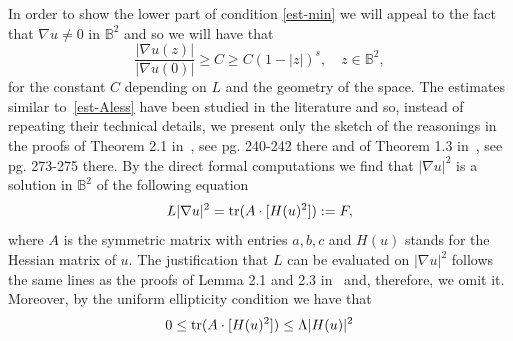 \documentclass[11pt,a4paper,reqno]{amsart}
\theoremstyle{definition}
\def\vint{\mathop{\mathchoice%
          {\setbox0\hbox{$\displaystyle\intop$}\kern 0.22\wd0%
           \vcenter{\hrule width 0.6\wd0}\kern -0.82\wd0}%
          {\setbox0\hbox{$\textstyle\intop$}\kern 0.2\wd0%
           \vcenter{\hrule width 0.6\wd0}\kern -0.8\wd0}%
          {\setbox0\hbox{$\scriptstyle\intop$}\kern 0.2\wd0%
           \vcenter{\hrule width 0.6\wd0}\kern -0.8\wd0}%
          {\setbox0\hbox{$\scriptscriptstyle\intop$}\kern 0.2\wd0%
           \vcenter{\hrule width 0.6\wd0}\kern -0.8\wd0}}%
          \mathopen{}\int}
\newcommand{\BB}{\mathbb{B}^2}
\numberwithin{komcounter}{section}
\begin{document}
In order to show the lower part of condition \eqref{est-min} we will appeal to the fact that $\nabla u\not =0$ in $\BB$ and so we will have that 
\begin{equation}\label{est-Aless}
 \frac{|\nabla u(z)|}{|\nabla u(0)|}\geq C \geq C (1-|z|)^{s},\quad z\in \BB,
\end{equation}
for the constant $C$ depending on $L$ and the geometry of the space. The estimates similar to~\eqref{est-Aless} have been studied in the literature and so, instead of repeating their technical details, we present only the sketch of the reasonings in the proofs of Theorem 2.1 in~\cite{al2}, see pg. 240-242 there and of Theorem 1.3 in~\cite{al1}, see pg. 273-275 there. By the direct formal computations we find that $|\nabla u|^2$ is a solution in $\BB$ of the following equation
\[
L|\nabla u|^2={\rm tr}(A \cdot [H(u)^2]):=F,
\]
where $A$ is the symmetric matrix with entries $a,b,c$ and $H(u)$ stands for the Hessian matrix of $u$. The justification that $L$ can be evaluated on $|\nabla u|^2$ follows the same lines as the proofs of Lemma 2.1 and 2.3 in~\cite{al2} and, therefore, we omit it. Moreover, by the uniform ellipticity condition we have that 
\[
0\leq {\rm tr}(A \cdot [H(u)^2])\leq \Lambda |H(u)|^2
\]
\end{document}

